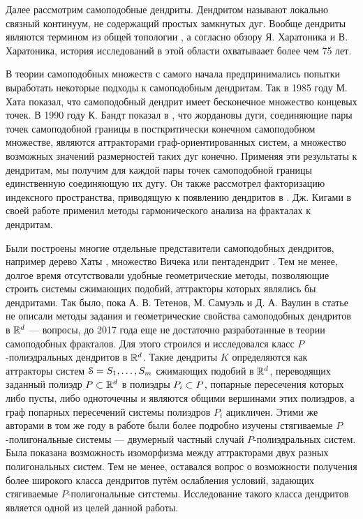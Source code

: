 Далее рассмотрим самоподобные дендриты.
Дендритом называют локально связный континуум, не содержащий простых замкнутых дуг.
Вообще дендриты являются термином из общей топологии \cite{Kur1, Kur2}, а согласно обзору \cite{Char1998} Я. Харатоника и В. Харатоника, история исследований в этой области охватываает более чем 75 лет.

В теории самоподобных множеств с самого начала предпринимались попытки выработать некоторые подходы к самоподобным дендритам.
Так в 1985 году М. Хата \cite{Hata1985} показал, что самоподобный дендрит имеет бесконечное множество концевых точек.
В 1990 году К. Бандт показал в \cite{SSS6}, что жордановы дуги, соединяющие пары точек самоподобной границы в посткритически конечном самоподобном множестве, являются аттракторами граф-ориентированных систем, а множество возможных значений размерностей таких дуг конечно.
Применяя эти результаты к дендритам, мы получим для каждой пары точек самоподобной границы единственную соединяющую их дугу.
Он также рассмотрел факторизацию индексного пространства, приводящую к появлению дендритов в \cite{SSS2}.
Дж. Кигами в своей работе \cite{Kig95} применил методы гармонического анализа на фракталах к дендритам. 

Были построены многие отдельные представители самоподобных дендритов, например дерево Хаты \cite{Hata1985}, множество Вичека или пентадендрит \cite{McWorter1987}.
Тем не менее, долгое время отсутствовали удобные геометрические методы, позволяющие строить системы сжимающих подобий, аттракторы которых являлись бы дендритами.
Так было, пока А. В. Тетенов, М. Самуэль и Д. А. Ваулин в статье \cite{TSV2017} не описали методы задания и геометрические свойства самоподобных дендритов в $\mathbb{R}^d$ --- вопросы, до 2017 года еще не достаточно разработанные в теории самоподобных фракталов. 
Для этого строился и исследовался класс $P$-полиэдральных дендритов в $\mathbb{R}^d$. 
Такие дендриты $K$ определяются как аттракторы систем ${\EuScript S} = {S_1,\ldots, S_m}$ сжимающих подобий в $\mathbb{R}^d$, переводящих заданный полиэдр $P \subset \mathbb{R}^d$ в полиэдры $P_i \subset P$, попарные пересечения которых либо пусты, либо одноточечны и являются общими вершинами этих полиэдров, а граф попарных пересечений системы полиэдров $P_i$ ацикличен.
Этими же авторами в том же году в работе \cite{STV2017} были более подробно изучены стягиваемые $P$-полигональные системы --- двумерный частный случай $P$-полиэдральных систем.
Была показана возможность изоморфизма между аттракторами двух разных полигональных систем.
Тем не менее, оставался вопрос о возможности получения более широкого класса дендритов путём ослабления условий, задающих стягиваемые $P$-полигональные ситстемы. 
Исследование такого класса дендритов является одной из целей данной работы.

